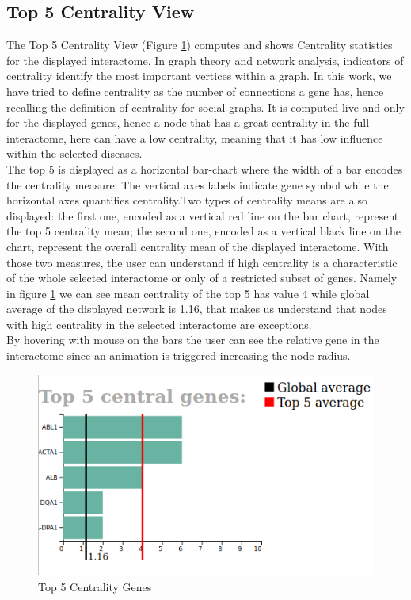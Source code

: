 \documentclass[12pt,twocolumn,twoside]{article}
\begin{document}
	\subsection*{Top 5 Centrality View}
	The Top 5 Centrality View (Figure \ref{top5}) computes and shows Centrality statistics for the displayed interactome. In graph theory and network analysis, indicators of centrality identify the most important vertices within a graph.  In this work, we have tried to define centrality as the number of connections a gene has, hence recalling the definition of centrality for social graphs. It is computed live and only for the displayed genes, hence a node that has a great centrality in the full interactome, here can have a low centrality, meaning that it has low influence within the selected diseases. \\ The top 5 is displayed as a horizontal bar-chart where the width of a bar encodes the centrality measure. The vertical axes labels indicate gene symbol while the horizontal axes quantifies centrality.\newline Two types of centrality means are also displayed: the first one, encoded as a vertical red line on the bar chart, represent the top 5 centrality mean; the second one, encoded as a vertical black line on the chart, represent the overall centrality mean of the displayed interactome. With those two measures, the user can understand if high centrality is a characteristic of the whole selected interactome or only of a restricted subset of genes. Namely in figure \ref{top5} we can see mean centrality of the top 5 has value 4 while global average of the displayed network is 1.16, that makes us understand that nodes with high centrality in the selected interactome are exceptions.\\ By hovering with mouse on the bars the user can see the relative gene in the interactome since an animation is triggered increasing the node radius.
	
	\begin{figure}
		\includegraphics[width=.95\linewidth]{top5.png}
		\caption{Top 5 Centrality Genes}
		\label{top5}
	\end{figure}
	
\end{document}
